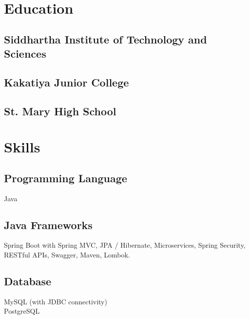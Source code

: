 \documentclass[]{deedy-resume-openfont}
\begin{document}
\begin{minipage}[t]{0.33\textwidth}
\section{Education} 

\subsection{Siddhartha Institute of \newline Technology and Sciences}
\sectionsep

\subsection{Kakatiya Junior College}
\sectionsep

\subsection{St. Mary High School}
\sectionsep


\section{Skills}
\subsection{Programming Language}
\textbullet{} Java  \\ 
\sectionsep

\subsection{Java Frameworks}
\textbullet{} Spring Boot with Spring MVC, 
JPA / Hibernate, Microservices, 
Spring Security, RESTful APIs, Swagger, Maven, Lombok. \\ 
\sectionsep


\subsection{Database}
\textbullet{} MySQL (with JDBC connectivity)\\ 
\textbullet{} PostgreSQL
\sectionsep


\end{minipage}
\end{document}
